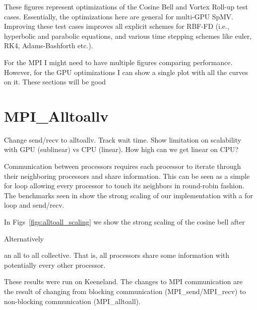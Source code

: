 
These figures represent optimizations of the Cosine Bell and Vortex Roll-up test cases. Essentially, the optimizations here are general for multi-GPU SpMV. Improving these test cases improves all explicit schemes for RBF-FD (i.e., hyperbolic and parabolic equations, and various time stepping schemes like euler, RK4, Adams-Bashforth etc.). 


For the MPI I might need to have multiple figures comparing performance. However, for the GPU optimizations I can show a single plot with all the curves on it. These sections will be good 

\section{MPI\_Alltoallv}
Change send/recv to alltoallv. Track wait time. Show limitation on scalability with GPU (sublinear) vs CPU (linear). How high can we get linear on CPU? 


Communication between processors requires each processor to iterate through their neighboring processors and share information. This can be seen as a simple for loop allowing every processor to touch its neighbors in round-robin fashion. The benchmarks seen in  show the strong scaling of our implementation with a for loop and send/recv. 

In Figs~\ref{figs:alltoall_scaling} we show the strong scaling of the cosine bell after 

Alternatively

an all to all collective. That is, all processors share some information with potentially every other processor. 

These results were run on Keeneland. The changes to MPI communication are the result of changing from blocking communication (MPI\_send/MPI\_recv) to non-blocking communication (MPI\_alltoall).

